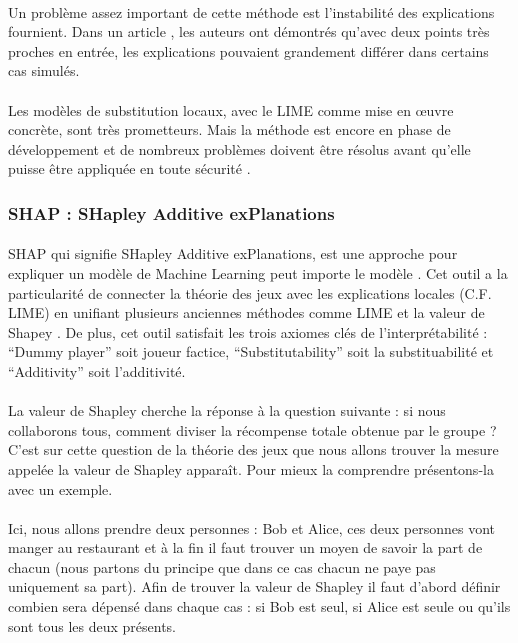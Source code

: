 \documentclass[10pt, french, a4paper]{report}
\begin{document}
\paragraph{}
Un problème assez important de cette méthode est l'instabilité des explications fournient. Dans un article \citep{alvarez_on_the_2018}, les auteurs ont démontrés qu'avec deux points très proches en entrée, les explications pouvaient grandement différer dans certains cas simulés. 

\paragraph{}
Les modèles de substitution locaux, avec le LIME comme mise en œuvre concrète, sont très prometteurs. Mais la méthode est encore en phase de développement et de nombreux problèmes doivent être résolus avant qu'elle puisse être appliquée en toute sécurité \citep{molnar2019}.

\subsubsection{SHAP : SHapley Additive exPlanations}

\paragraph{}
SHAP qui signifie SHapley Additive exPlanations, est une approche pour expliquer un modèle de Machine Learning peut importe le modèle \citep{NIPS2017_7062}. Cet outil a la particularité de connecter la théorie des jeux avec les explications locales (C.F. LIME) en unifiant plusieurs anciennes méthodes comme LIME et la valeur de Shapey \citep{shapley_17._1953}. De plus, cet outil satisfait les trois axiomes clés de l’interprétabilité : ``Dummy player'' soit joueur factice, ``Substitutability'' soit la substituabilité et ``Additivity'' soit l’additivité.

\paragraph{}
La valeur de Shapley cherche la réponse à la question suivante : si nous collaborons tous, comment diviser la récompense totale obtenue par le groupe ? C’est sur cette question de la théorie des jeux que nous allons trouver la mesure appelée la valeur de Shapley apparaît. Pour mieux la comprendre présentons-la avec un exemple.

\paragraph{}
Ici, nous allons prendre deux personnes : Bob et Alice, ces deux personnes vont manger au restaurant et à la fin il faut trouver un moyen de savoir la part de chacun (nous partons du principe que dans ce cas chacun ne paye pas uniquement sa part). Afin de trouver la valeur de Shapley il faut d’abord définir combien sera dépensé dans chaque cas : si Bob est seul, si Alice est seule ou qu’ils sont tous les deux présents. 
\end{document}
